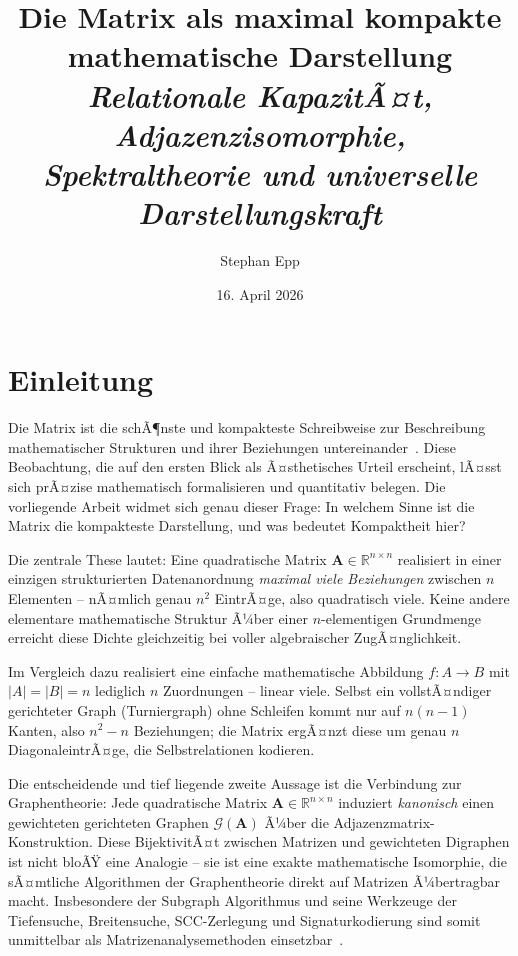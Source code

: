 ﻿\documentclass[12pt, a4paper]{article}
\title{\textbf{Die Matrix als maximal kompakte\\ mathematische Darstellung}\\[0.5em]
  {\Large\itshape Relationale KapazitÃ¤t, Adjazenzisomorphie,\\ Spektraltheorie und universelle
   Darstellungskraft}}
\author{Stephan Epp}
\date{16. April 2026}
\theoremstyle{definition}
\theoremstyle{remark}
\newcommand{\R}{\mathbb{R}}
\newcommand{\vA}{\bm{A}}
\begin{document}

\maketitle
\tableofcontents
\newpage

\section{Einleitung}
\label{sec:einleitung}

Die Matrix ist die schÃ¶nste und kompakteste Schreibweise zur Beschreibung
mathematischer Strukturen und ihrer Beziehungen untereinander~\citep{horn2013}.
Diese Beobachtung, die auf den ersten Blick als Ã¤sthetisches Urteil erscheint,
lÃ¤sst sich prÃ¤zise mathematisch formalisieren und quantitativ belegen. Die
vorliegende Arbeit widmet sich genau dieser Frage: In welchem Sinne ist die
Matrix die kompakteste Darstellung, und was bedeutet Kompaktheit hier?

Die zentrale These lautet: Eine quadratische Matrix $\vA \in \R^{n \times n}$
realisiert in einer einzigen strukturierten Datenanordnung \emph{maximal viele
Beziehungen} zwischen $n$ Elementen -- nÃ¤mlich genau $n^2$ EintrÃ¤ge, also
quadratisch viele. Keine andere elementare mathematische Struktur Ã¼ber einer
$n$-elementigen Grundmenge erreicht diese Dichte gleichzeitig bei voller
algebraischer ZugÃ¤nglichkeit.

Im Vergleich dazu realisiert eine einfache mathematische Abbildung
$f: A \to B$ mit $|A| = |B| = n$ lediglich $n$ Zuordnungen -- linear viele.
Selbst ein vollstÃ¤ndiger gerichteter Graph (Turniergraph) ohne Schleifen
kommt nur auf $n(n-1)$ Kanten, also $n^2 - n$ Beziehungen; die Matrix
ergÃ¤nzt diese um genau $n$ DiagonaleintrÃ¤ge, die Selbstrelationen kodieren.

Die entscheidende und tief liegende zweite Aussage ist die Verbindung zur
Graphentheorie: Jede quadratische Matrix $\vA \in \R^{n \times n}$ induziert
\emph{kanonisch} einen gewichteten gerichteten Graphen $\mathcal{G}(\vA)$
Ã¼ber die Adjazenzmatrix-Konstruktion. Diese BijektivitÃ¤t zwischen Matrizen
und gewichteten Digraphen ist nicht bloÃŸ eine Analogie -- sie ist eine exakte
mathematische Isomorphie, die sÃ¤mtliche Algorithmen der Graphentheorie direkt
auf Matrizen Ã¼bertragbar macht. Insbesondere der Subgraph Algorithmus
\citep{epp2026subgraph} und seine Werkzeuge der Tiefensuche, Breitensuche,
SCC-Zerlegung und Signaturkodierung sind somit unmittelbar als
Matrizenanalysemethoden einsetzbar~\citep{epp2026sysstate}.
\end{document}
